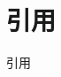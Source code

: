 \documentclass[unicode,12pt,aspectratio=169,dvipdfmx]{beamer}
\begin{document}



\section{引用}
\begin{frame}{引用}
\end{frame}
\end{document}
